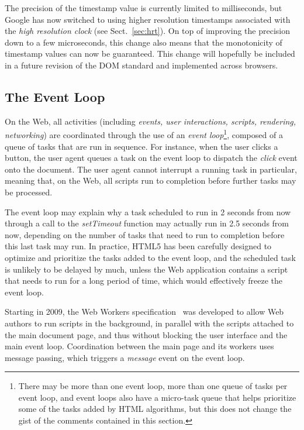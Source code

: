 The precision of the timestamp value is currently limited to milliseconds, but
Google has now switched to using higher resolution timestamps associated with
the \emph{high resolution clock} (see Sect.~\ref{sec:hrt}). On top of
improving the precision down to a few microseconds, this change also means
that the monotonicity of timestamp values can now be guaranteed. This change
will hopefully be included in a future revision of the DOM standard and
implemented across browsers.



\subsection{The Event Loop}
\label{sec:eventloop}

On the Web, all activities (including \emph{events, user interactions,
scripts, rendering, networking}) are coordinated through the use of an
\emph{event loop}\footnote{There may be more than one event loop, more than
one queue of tasks per event loop, and event loops also have a micro-task
queue that helps prioritize some of the tasks added by HTML algorithms, but
this does not change the gist of the comments contained in this section.},
composed of a queue of tasks that are run in sequence. For instance, when the
user clicks a button, the user agent queues a task on the event loop to
dispatch the \emph{click} event onto the document. The user agent cannot
interrupt a running task in particular, meaning that, on the Web, all scripts
run to completion before further tasks may be processed.

The event loop may explain why a task scheduled to run in 2 seconds from now
through a call to the \emph{setTimeout} function may actually run in 2.5 seconds
from now, depending on the number of tasks that need to run to completion
before this last task may run. In practice, HTML5 has been carefully designed
to optimize and prioritize the tasks added to the event loop, and the
scheduled task is unlikely to be delayed by much, unless the Web application
contains a script that needs to run for a long period of time, which would
effectively freeze the event loop.

Starting in 2009, the Web Workers specification~\cite{webworkers} was developed to allow
Web authors to run scripts in the background, in parallel with the scripts
attached to the main document page, and thus without blocking the user
interface and the main event loop. Coordination between the main page and its
workers uses message passing, which triggers a \emph{message} event on the event
loop.

